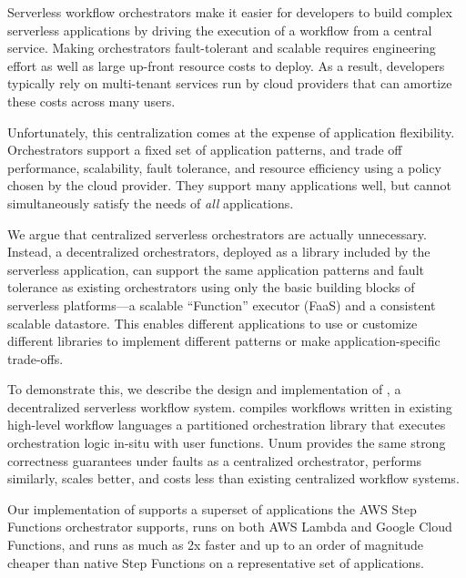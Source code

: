 Serverless workflow orchestrators make it easier for developers to build complex
serverless applications by driving the execution of a workflow from a central
service.  Making orchestrators fault-tolerant and scalable requires engineering
effort as well as large up-front resource costs to deploy. As a result,
developers typically rely on multi-tenant services run by cloud providers that
can amortize these costs across many users.

Unfortunately, this centralization comes at the expense of application
flexibility. Orchestrators support a fixed set of application patterns, and
trade off performance, scalability, fault tolerance, and resource efficiency
using a policy chosen by the cloud provider. They support many applications
well, but cannot simultaneously satisfy the needs of \emph{all} applications.

We argue that centralized serverless orchestrators are actually unnecessary.
Instead, a decentralized orchestrators, deployed as a library included by the
serverless application, can support the same application patterns and fault
tolerance as existing orchestrators using only the basic building blocks of
serverless platforms---a scalable ``Function'' executor (FaaS) and a consistent
scalable datastore. This enables different applications to use or customize
different libraries to implement different patterns or make application-specific
trade-offs.

To demonstrate this, we describe the design and implementation of \name{}, a
decentralized serverless workflow system. \name{} compiles workflows written in
existing high-level workflow languages a partitioned orchestration library that
executes orchestration logic in-situ with user functions. Unum provides the same
strong correctness guarantees under faults as a centralized orchestrator, performs
similarly, scales better, and costs less than existing centralized workflow
systems.

Our implementation of \name{} supports a superset of applications the AWS Step
Functions orchestrator supports, runs on both AWS Lambda and Google Cloud
Functions, and runs as much as 2x faster and up to an order of magnitude cheaper
than native Step Functions on a representative set of applications.
